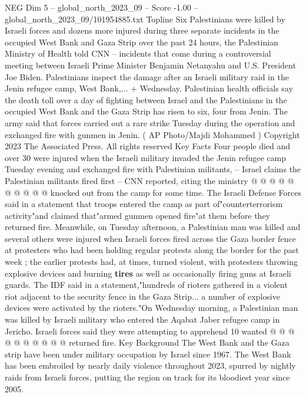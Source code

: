 \begin{textsample}{NEG Dim 5 – global\_north\_2023\_09 – Score -1.00 – global\_north\_2023\_09/101954885.txt}  \label{ex:f5_neg_010}
Topline Six Palestinians were killed by Israeli forces and dozens more injured during three separate incidents in the occupied West Bank and Gaza Strip over the past 24 hours, the Palestinian Ministry of Health told CNN -- incidents that come during a controversial meeting between Israeli Prime Minister Benjamin Netanyahu and U.S.
President Joe Biden.
Palestinians inspect the damage after an Israeli military raid in the Jenin refugee camp, West Bank,... + Wednesday.
Palestinian health officials say the death toll over a day of fighting between Israel and the Palestinians in the occupied West Bank and the Gaza Strip has risen to six, four from Jenin.
The army said that forces carried out a rare strike Tuesday during the operation and exchanged fire with gunmen in Jenin. ( AP Photo/Majdi Mohammed ) Copyright 2023 The Associated Press.
All rights reserved Key Facts Four people died and over 30 were injured when the Israeli military invaded the Jenin refugee camp Tuesday evening and exchanged fire with Palestinian militants, -- Israel claims the Palestinian militants fired first -- CNN reported, citing the ministry @ @ @ @ @ @ @ @ @ @ knocked out from the camp for some time.
The Israeli Defense Forces said in a statement that troops entered the camp as part of"counterterrorism activity"and claimed that"armed gunmen opened fire"at them before they returned fire.
Meanwhile, on Tuesday afternoon, a Palestinian man was killed and several others were injured when Israeli forces fired across the Gaza border fence at protesters who had been holding regular protests along the border for the past week ; the earlier protests had, at times, turned violent, with protesters throwing explosive devices and burning \textbf{tires} as well as occasionally firing guns at Israeli guards.
The IDF said in a statement,"hundreds of rioters gathered in a violent riot adjacent to the security fence in the Gaza Strip... a number of explosive devices were activated by the rioters."On Wednesday morning, a Palestinian man was killed by Israeli military who entered the Aqabat Jaber refugee camp in Jericho.
Israeli forces said they were attempting to apprehend 10 wanted @ @ @ @ @ @ @ @ @ @ returned fire.
Key Background The West Bank and the Gaza strip have been under military occupation by Israel since 1967.
The West Bank has been embroiled by nearly daily violence throughout 2023, spurred by nightly raids from Israeli forces, putting the region on track for its bloodiest year since 2005.

\end{textsample}
